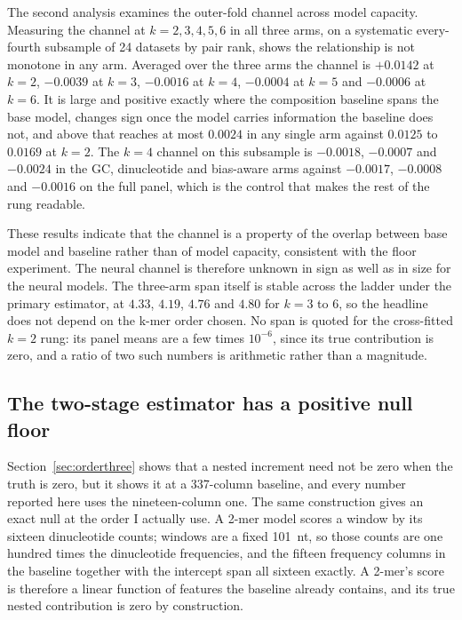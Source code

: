 The second analysis examines the outer-fold channel across model capacity. Measuring the
channel at $k = 2, 3, 4, 5, 6$ in all three arms, on a systematic every-fourth subsample of 24
datasets by pair rank, shows the relationship is not monotone in any arm. Averaged over the
three arms the channel is $+0.0142$ at $k=2$, $-0.0039$ at $k=3$, $-0.0016$ at $k=4$, $-0.0004$
at $k=5$ and $-0.0006$ at $k=6$. It is large and positive exactly where the composition
baseline spans the base model, changes sign once the model carries information the baseline does
not, and above that reaches at most $0.0024$ in any single arm against $0.0125$ to $0.0169$ at
$k=2$. The $k=4$ channel on this subsample is $-0.0018$, $-0.0007$
and $-0.0024$ in the GC, dinucleotide and bias-aware arms against $-0.0017$, $-0.0008$ and
$-0.0016$ on the full panel, which is the control that makes the rest of the rung readable.

These results indicate that the channel is a property of the overlap between base model and
baseline rather than of model capacity, consistent with the floor experiment. The neural
channel is therefore unknown in sign as well as in size for the neural models. The three-arm span
itself is stable across the ladder under the primary estimator, at $4.33$, $4.19$, $4.76$ and
$4.80$ for $k = 3$ to $6$, so the headline does not depend on the k-mer order chosen. No span
is quoted for the cross-fitted $k=2$ rung: its panel means are a few times $10^{-6}$, since its
true contribution is zero, and a ratio of two such numbers is arithmetic rather than a
magnitude.

\subsection{The two-stage estimator has a positive null floor}
\label{sec:floor}

Section~\ref{sec:orderthree} shows that a nested increment need not be zero when the truth is
zero, but it shows it at a 337-column baseline, and every number reported here uses the
nineteen-column one. The same construction gives an exact null at the order I actually use. A
2-mer model scores a window by its sixteen dinucleotide counts; windows are a fixed 101~nt, so
those counts are one hundred times the dinucleotide frequencies, and the fifteen frequency
columns in the baseline together with the intercept span all sixteen exactly. A 2-mer's score is
therefore a linear function of features the baseline already contains, and its true nested
contribution is zero by construction.

